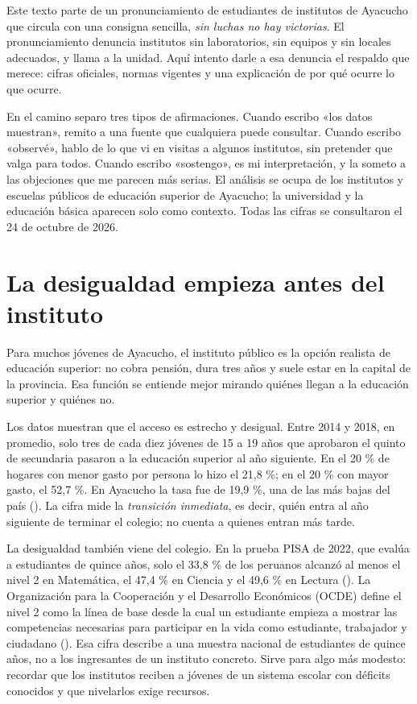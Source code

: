 \documentclass[
  jou,
  floatsintext,
  longtable,
  a4paper,
  nolmodern,
  notxfonts,
  notimes,
  12pt,
  colorlinks=true,linkcolor=blue,citecolor=blue,urlcolor=blue]{apa7}
\begin{document}
Este texto parte de un pronunciamiento de estudiantes de institutos de
Ayacucho que circula con una consigna sencilla, \emph{sin luchas no hay
victorias}. El pronunciamiento denuncia institutos sin laboratorios, sin
equipos y sin locales adecuados, y llama a la unidad. Aquí intento darle
a esa denuncia el respaldo que merece: cifras oficiales, normas vigentes
y una explicación de por qué ocurre lo que ocurre.

En el camino separo tres tipos de afirmaciones. Cuando escribo «los
datos muestran», remito a una fuente que cualquiera puede consultar.
Cuando escribo «observé», hablo de lo que vi en visitas a algunos
institutos, sin pretender que valga para todos. Cuando escribo
«sostengo», es mi interpretación, y la someto a las objeciones que me
parecen más serias. El análisis se ocupa de los institutos y escuelas
públicos de educación superior de Ayacucho; la universidad y la
educación básica aparecen solo como contexto. Todas las cifras se
consultaron el 24 de octubre de 2026.

\section{La desigualdad empieza antes del
instituto}\label{la-desigualdad-empieza-antes-del-instituto}

Para muchos jóvenes de Ayacucho, el instituto público es la opción
realista de educación superior: no cobra pensión, dura tres años y suele
estar en la capital de la provincia. Esa función se entiende mejor
mirando quiénes llegan a la educación superior y quiénes no.

Los datos muestran que el acceso es estrecho y desigual. Entre 2014 y
2018, en promedio, solo tres de cada diez jóvenes de 15 a 19 años que
aprobaron el quinto de secundaria pasaron a la educación superior al año
siguiente. En el 20 \% de hogares con menor gasto por persona lo hizo el
21,8 \%; en el 20 \% con mayor gasto, el 52,7 \%. En Ayacucho la tasa
fue de 19,9 \%, una de las más bajas del país
(). La cifra mide la \emph{transición
inmediata}, es decir, quién entra al año siguiente de terminar el
colegio; no cuenta a quienes entran más tarde.

La desigualdad también viene del colegio. En la prueba PISA de 2022, que
evalúa a estudiantes de quince años, solo el 33,8 \% de los peruanos
alcanzó al menos el nivel 2 en Matemática, el 47,4 \% en Ciencia y el
49,6 \% en Lectura
(). La Organización para la Cooperación y el
Desarrollo Económicos (OCDE) define el nivel 2 como la línea de base
desde la cual un estudiante empieza a mostrar las competencias
necesarias para participar en la vida como estudiante, trabajador y
ciudadano
(). Esa cifra describe a una muestra nacional de
estudiantes de quince años, no a los ingresantes de un instituto
concreto. Sirve para algo más modesto: recordar que los institutos
reciben a jóvenes de un sistema escolar con déficits conocidos y que
nivelarlos exige recursos.
\end{document}
